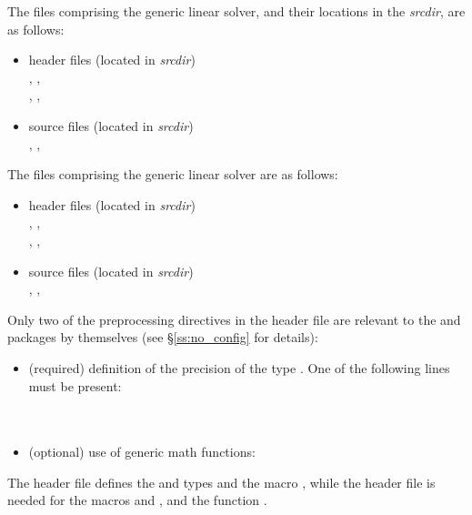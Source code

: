 The files comprising the {\dense} generic linear solver, and their locations
in the {\sundials} {\em srcdir}, are as follows:
\begin{itemize}
\item header files (located in {\em srcdir})\\
  , , \\
  , ,  
\item source files (located in {\em srcdir})\\
  , , 
\end{itemize}
The files comprising the {\band} generic linear solver are as follows:
\begin{itemize}
\item header files (located in {\em srcdir})\\
  , , \\
  , ,  
\item source files (located in {\em srcdir})\\
  , , 
\end{itemize}
Only two of the preprocessing directives in the header file  
are relevant to the {\dense} and {\band} packages by themselves (see
\S\ref{ss:no_config} for details):
\begin{itemize}
\item (required) definition of the precision of the {\sundials} type . 
  One of the following lines must be present:\\
  \\
  \\
\item (optional) use of generic math functions:
\end{itemize}
The  header file defines the {\sundials}  and
 types and the macro , while the 
header file is needed for the macros  and , and the
function .

